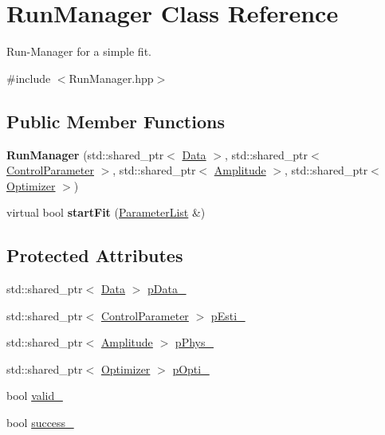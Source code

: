 \hypertarget{class_run_manager}{\section{Run\-Manager Class Reference}
\label{class_run_manager}
}


Run-\/\-Manager for a simple fit.  




{\ttfamily \#include $<$Run\-Manager.\-hpp$>$}

\subsection*{Public Member Functions}
\begin{DoxyCompactItemize}
\item 
\hypertarget{class_run_manager_aead1ac6003c972f12a51560249624cef}{{\bfseries Run\-Manager} (std\-::shared\-\_\-ptr$<$ \hyperlink{class_data}{Data} $>$, std\-::shared\-\_\-ptr$<$ \hyperlink{class_control_parameter}{Control\-Parameter} $>$, std\-::shared\-\_\-ptr$<$ \hyperlink{class_amplitude}{Amplitude} $>$, std\-::shared\-\_\-ptr$<$ \hyperlink{class_optimizer}{Optimizer} $>$)}\label{class_run_manager_aead1ac6003c972f12a51560249624cef}

\item 
\hypertarget{class_run_manager_aede1e2e83985e2904b8b094d1b1eec12}{virtual bool {\bfseries start\-Fit} (\hyperlink{class_parameter_list}{Parameter\-List} \&)}\label{class_run_manager_aede1e2e83985e2904b8b094d1b1eec12}

\end{DoxyCompactItemize}
\subsection*{Protected Attributes}
\begin{DoxyCompactItemize}
\item 
std\-::shared\-\_\-ptr$<$ \hyperlink{class_data}{Data} $>$ \hyperlink{class_run_manager_ac5567c21ce343a46afb025643aa7add0}{p\-Data\-\_\-}
\item 
std\-::shared\-\_\-ptr$<$ \hyperlink{class_control_parameter}{Control\-Parameter} $>$ \hyperlink{class_run_manager_a37ed02a3d6f47131ef7e52a20816d48a}{p\-Esti\-\_\-}
\item 
std\-::shared\-\_\-ptr$<$ \hyperlink{class_amplitude}{Amplitude} $>$ \hyperlink{class_run_manager_a27ed6052f42c745bed63626b65f8dc77}{p\-Phys\-\_\-}
\item 
std\-::shared\-\_\-ptr$<$ \hyperlink{class_optimizer}{Optimizer} $>$ \hyperlink{class_run_manager_a55757983ceeeb8b4d687123e9804f6fc}{p\-Opti\-\_\-}
\item 
bool \hyperlink{class_run_manager_a0680769857728209363f2404a50a9f50}{valid\-\_\-}
\item 
bool \hyperlink{class_run_manager_a5d27906c077b0e898abd56722a593886}{success\-\_\-}
\end{DoxyCompactItemize}


